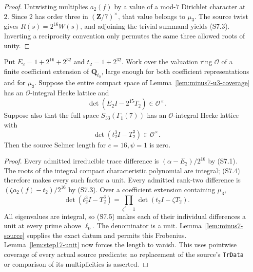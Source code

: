 \begin{proof}
Untwisting multiplies \(a_2(f)\) by a value of a mod-\(7\)
Dirichlet character at \(2\). Since \(2\) has order three in
\((\mathbf Z/7)^\times\), that value belongs to \(\mu_3\).
The source twist gives
\(R(s)=2^{16}W(s)\), and adjoining the trivial summand yields
(S7.3). Inverting a reciprocity convention only permutes
the same three allowed roots of unity.
\end{proof}

\begin{corollary}\label{cor:minus7-unit}
Put \(E_2=1+2^{16}+2^{32}\) and \(t_2=1+2^{32}\).
Work over the valuation ring \(\mathcal O\) of a finite
coefficient extension of \(\mathbf Q_{\ell_0}\), large enough
for both coefficient representations and for \(\mu_3\).
Suppose the entire compact space of
Lemma~\ref{lem:minus7-u3-coverage} has an
\(\mathcal O\)-integral Hecke lattice and
\[
 \det(E_2I-2^{15}T_2)\in\mathcal O^{\times}.
 \tag{S7.4}
\]
Suppose also that the full space \(S_{33}(\Gamma_1(7))\)
has an \(\mathcal O\)-integral Hecke lattice with
\[
 \det(t_2^3 I-T_2^3)\in\mathcal O^{\times}.
 \tag{S7.5}
\]
Then the source Selmer length for \(e=16,\psi=1\) is zero.
\end{corollary}

\begin{proof}
Every admitted irreducible trace difference is
\((\alpha-E_2)/2^{16}\) by (S7.1).
The roots of the integral compact characteristic polynomial
are integral; (S7.4) therefore makes every such factor a unit.
Every admitted rank-two difference is
\((\zeta a_2(f)-t_2)/2^{16}\) by (S7.3).
Over a coefficient extension containing \(\mu_3\),
\[
 \det(t_2^3I-T_2^3)
   =\prod_{\zeta^3=1}\det(t_2I-\zeta T_2).
\]
All eigenvalues are integral, so (S7.5) makes each of their
individual differences a unit at every prime above \(\ell_0\).
The denominator is a unit. Lemma~\ref{lem:minus7-source}
supplies the exact datum and permits this Frobenius.
Lemma~\ref{lem:step17-unit} now forces the length to vanish.
This uses pointwise coverage of every actual source predicate;
no replacement of the source's \texttt{TrData} or comparison
of its multiplicities is asserted.
\end{proof}
